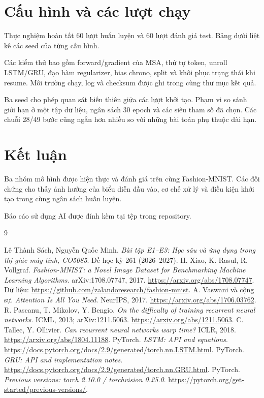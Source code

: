 \documentclass[12pt,a4paper]{report}
\numberwithin{equation}{chapter}
\newcommand{\code}[1]{\texttt{\detokenize{#1}}}
\begin{document}
\section{Cấu hình và các lượt chạy}
Thực nghiệm hoàn tất 60 lượt huấn luyện và 60 lượt đánh giá test. Bảng dưới liệt kê các seed của từng cấu hình.

{\small}

Các kiểm thử bao gồm forward/gradient của MSA, thứ tự token, unroll LSTM/GRU, đạo hàm regularizer, bias chrono, split và khôi phục trạng thái khi resume. Môi trường chạy, log và checksum được ghi trong \code{docs/TRAINING_EXECUTION.md} cùng thư mục kết quả.

Ba seed cho phép quan sát biến thiên giữa các lượt khởi tạo. Phạm vi so sánh giới hạn ở một tập dữ liệu, ngân sách 30 epoch và các siêu tham số đã chọn. Các chuỗi 28/49 bước cũng ngắn hơn nhiều so với những bài toán phụ thuộc dài hạn.

\section{Kết luận}
Ba nhóm mô hình được hiện thực và đánh giá trên cùng Fashion-MNIST. Các đối chứng cho thấy ảnh hưởng của biểu diễn đầu vào, cơ chế xử lý và điều kiện khởi tạo trong cùng ngân sách huấn luyện.

Báo cáo sử dụng AI được đính kèm tại tệp \code{AI_USE_REPORT.md} trong repository.

\begin{thebibliography}{9}
 Lê Thành Sách, Nguyễn Quốc Minh. \emph{Bài tập E1–E3: Học sâu và ứng dụng trong thị giác máy tính, CO5085}. Đề học kỳ 261 (2026–2027).
 H. Xiao, K. Rasul, R. Vollgraf. \emph{Fashion-MNIST: a Novel Image Dataset for Benchmarking Machine Learning Algorithms}. arXiv:1708.07747, 2017. \url{https://arxiv.org/abs/1708.07747}. Dữ liệu: \url{https://github.com/zalandoresearch/fashion-mnist}.
 A. Vaswani và cộng sự. \emph{Attention Is All You Need}. NeurIPS, 2017. \url{https://arxiv.org/abs/1706.03762}.
 R. Pascanu, T. Mikolov, Y. Bengio. \emph{On the difficulty of training recurrent neural networks}. ICML, 2013; arXiv:1211.5063. \url{https://arxiv.org/abs/1211.5063}.
 C. Tallec, Y. Ollivier. \emph{Can recurrent neural networks warp time?} ICLR, 2018. \url{https://arxiv.org/abs/1804.11188}.
 PyTorch. \emph{LSTM: API and equations}. \url{https://docs.pytorch.org/docs/2.9/generated/torch.nn.LSTM.html}.
 PyTorch. \emph{GRU: API and implementation notes}. \url{https://docs.pytorch.org/docs/2.9/generated/torch.nn.GRU.html}.
 PyTorch. \emph{Previous versions: torch 2.10.0 / torchvision 0.25.0}. \url{https://pytorch.org/get-started/previous-versions/}.
\end{thebibliography}
\end{document}
